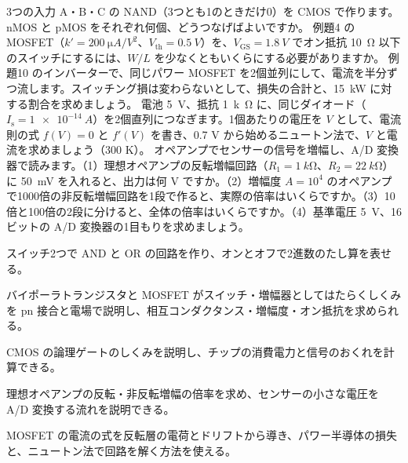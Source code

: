 \bkproblem 3つの入力 A・B・C の NAND（3つとも1のときだけ0）を CMOS で作ります。nMOS と pMOS をそれぞれ何個、どうつなげばよいですか。
\bkproblem 例題4 の MOSFET（$k'=\qty{200}{\micro A/V^2}$、$V_{\mathrm{th}}=\qty{0.5}{V}$）を、$V_{\mathrm{GS}}=\qty{1.8}{V}$ でオン抵抗 \qty{10}{\ohm} 以下のスイッチにするには、$W/L$ を少なくともいくらにする必要がありますか。
\bkproblem 例題10 のインバーターで、同じパワー MOSFET を2個並列にして、電流を半分ずつ流します。スイッチング損は変わらないとして、損失の合計と、\qty{15}{kW} に対する割合を求めましょう。
\bkproblem 電池 \qty{5}{V}、抵抗 \qty{1}{k\ohm} に、同じダイオード（$I_{\mathrm s}=\qty{1e-14}{A}$）を2個直列につなぎます。1個あたりの電圧を $V$ として、電流則の式 $f(V)=0$ と $f'(V)$ を書き、0.7 V から始めるニュートン法で、$V$ と電流を求めましょう（300 K）。
\bkproblem オペアンプでセンサーの信号を増幅し、A/D 変換器で読みます。（1）理想オペアンプの反転増幅回路（$R_1=\qty{1}{k\ohm}$、$R_2=\qty{22}{k\ohm}$）に \qty{50}{mV} を入れると、出力は何 V ですか。（2）増幅度 $A=10^4$ のオペアンプで1000倍の非反転増幅回路を1段で作ると、実際の倍率はいくらですか。（3）10倍と100倍の2段に分けると、全体の倍率はいくらですか。（4）基準電圧 \qty{5}{V}、16 ビットの A/D 変換器の1目もりを求めましょう。

\begin{furikaeri}
\begin{checklist}
\item スイッチ2つで AND と OR の回路を作り、オンとオフで2進数のたし算を表せる。
\item バイポーラトランジスタと MOSFET がスイッチ・増幅器としてはたらくしくみを pn 接合と電場で説明し、相互コンダクタンス・増幅度・オン抵抗を求められる。
\item CMOS の論理ゲートのしくみを説明し、チップの消費電力と信号のおくれを計算できる。
\item 理想オペアンプの反転・非反転増幅の倍率を求め、センサーの小さな電圧を A/D 変換する流れを説明できる。
\item MOSFET の電流の式を反転層の電荷とドリフトから導き、パワー半導体の損失と、ニュートン法で回路を解く方法を使える。
\end{checklist}
\end{furikaeri}
